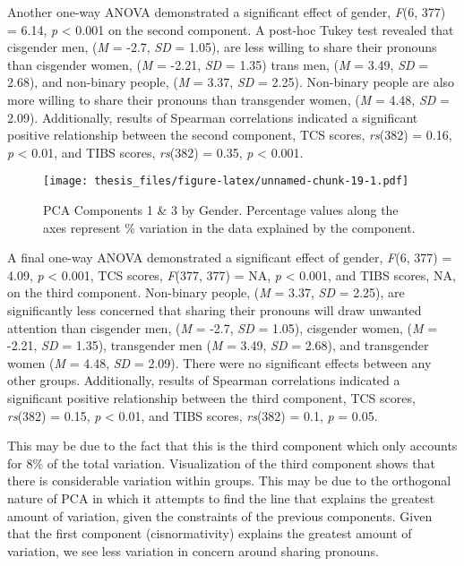 \documentclass[12pt,twoside]{reedthesis}
\begin{document}
Another one-way ANOVA demonstrated a significant effect of gender, \emph{F}(6, 377) = 6.14, \emph{p} \textless{} 0.001 on the second component. A post-hoc Tukey test revealed that cisgender men, (\emph{M} = -2.7, \emph{SD} = 1.05), are less willing to share their pronouns than cisgender women, (\emph{M} = -2.21, \emph{SD} = 1.35) trans men, (\emph{M} = 3.49, \emph{SD} = 2.68), and non-binary people, (\emph{M} = 3.37, \emph{SD} = 2.25). Non-binary people are also more willing to share their pronouns than transgender women, (\emph{M} = 4.48, \emph{SD} = 2.09). Additionally, results of Spearman correlations indicated a significant positive relationship between the second component, TCS scores, \emph{rs}(382) = 0.16, \emph{p} \textless{} 0.01, and TIBS scores, \emph{rs}(382) = 0.35, \emph{p} \textless{} 0.001.
\begin{figure}
\centering
\texttt{[image: thesis\_files/figure-latex/unnamed-chunk-19-1.pdf]}
\caption{\label{fig:unnamed-chunk-19}PCA Components 1 \& 3 by Gender. Percentage values along the axes represent \% variation in the data explained by the component.}
\end{figure}
A final one-way ANOVA demonstrated a significant effect of gender, \emph{F}(6, 377) = 4.09, \emph{p} \textless{} 0.001, TCS scores, \emph{F}(377, 377) = NA, \emph{p} \textless{} 0.001, and TIBS scores, NA, on the third component. Non-binary people, (\emph{M} = 3.37, \emph{SD} = 2.25), are significantly less concerned that sharing their pronouns will draw unwanted attention than cisgender men, (\emph{M} = -2.7, \emph{SD} = 1.05), cisgender women, (\emph{M} = -2.21, \emph{SD} = 1.35), transgender men (\emph{M} = 3.49, \emph{SD} = 2.68), and transgender women (\emph{M} = 4.48, \emph{SD} = 2.09). There were no significant effects between any other groups. Additionally, results of Spearman correlations indicated a significant positive relationship between the third component, TCS scores, \emph{rs}(382) = 0.15, \emph{p} \textless{} 0.01, and TIBS scores, \emph{rs}(382) = 0.1, \emph{p} = 0.05.

This may be due to the fact that this is the third component which only accounts for 8\% of the total variation. Visualization of the third component shows that there is considerable variation within groups. This may be due to the orthogonal nature of PCA in which it attempts to find the line that explains the greatest amount of variation, given the constraints of the previous components. Given that the first component (cisnormativity) explains the greatest amount of variation, we see less variation in concern around sharing pronouns.
\end{document}
